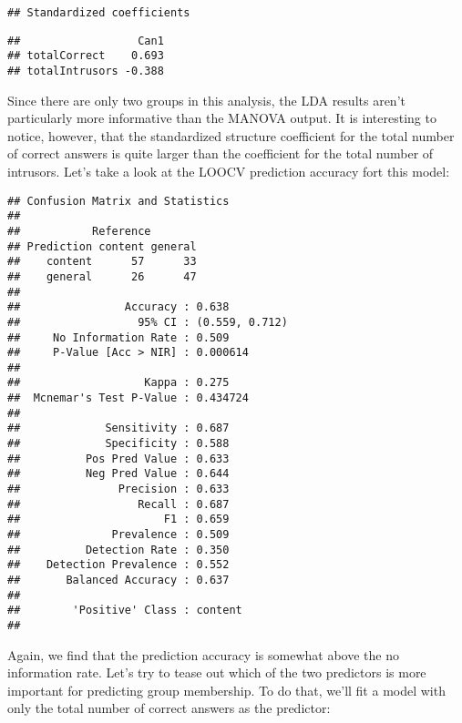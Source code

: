 \documentclass[11pt,]{article}
\begin{document}
\begin{verbatim}
## Standardized coefficients
\end{verbatim}

\begin{verbatim}
##                  Can1
## totalCorrect    0.693
## totalIntrusors -0.388
\end{verbatim}

Since there are only two groups in this analysis, the LDA results aren't
particularly more informative than the MANOVA output. It is interesting
to notice, however, that the standardized structure coefficient for the
total number of correct answers is quite larger than the coefficient for
the total number of intrusors. Let's take a look at the LOOCV prediction
accuracy fort this model:

\begin{verbatim}
## Confusion Matrix and Statistics
## 
##           Reference
## Prediction content general
##    content      57      33
##    general      26      47
##                                         
##                Accuracy : 0.638         
##                  95% CI : (0.559, 0.712)
##     No Information Rate : 0.509         
##     P-Value [Acc > NIR] : 0.000614      
##                                         
##                   Kappa : 0.275         
##  Mcnemar's Test P-Value : 0.434724      
##                                         
##             Sensitivity : 0.687         
##             Specificity : 0.588         
##          Pos Pred Value : 0.633         
##          Neg Pred Value : 0.644         
##               Precision : 0.633         
##                  Recall : 0.687         
##                      F1 : 0.659         
##              Prevalence : 0.509         
##          Detection Rate : 0.350         
##    Detection Prevalence : 0.552         
##       Balanced Accuracy : 0.637         
##                                         
##        'Positive' Class : content       
## 
\end{verbatim}

Again, we find that the prediction accuracy is somewhat above the no
information rate. Let's try to tease out which of the two predictors is
more important for predicting group membership. To do that, we'll fit a
model with only the total number of correct answers as the predictor:
\end{document}
